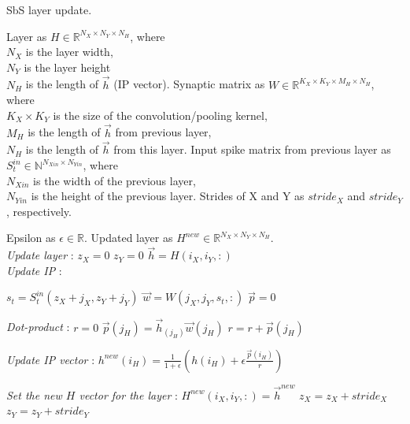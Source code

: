 \begin{algorithm}[t]
	\caption{SbS layer update.} \label{alg:update}
	
	\begin{algorithmic}[1]
		\SetAlgoLined
		\renewcommand{\algorithmicrequire}{\textbf{input:}}
		\renewcommand{\algorithmicensure}{\textbf{output:}}
		\REQUIRE Layer as $H\in\mathbb{R}^{N_X \times N_Y \times N_H}$, where\\
		$N_X$ is the layer width,\\
		$N_Y$ is the layer height\\
		$N_H$ is the length of $\vec{h}$ (IP vector).
		\REQUIRE Synaptic matrix as $W\in\mathbb{R}^{K_X \times K_Y \times M_H\times N_H}$, where\\
		$K_X \times K_Y$ is the size of the convolution/pooling kernel, \\
		$M_H$ is the length of $\vec{h}$ from previous layer,\\
		$N_H$ is the length of $\vec{h}$ from this layer.  
		\REQUIRE Input spike matrix from previous layer as $S_t^{in} \in\mathbb{N}^{N_{Xin} \times N_{Yin}}$, where\\
		$N_{Xin}$ is the width of the previous layer,\\
		$N_{Yin}$ is the height of the previous layer.
		\REQUIRE Strides of X and Y as $stride_{X}$ and $stride_{Y}$, respectively.
		
		\REQUIRE Epsilon as $\epsilon\in\mathbb{R}$.
		\ENSURE Updated layer as $H^{new}\in\mathbb{R}^{N_X \times N_Y \times N_H}$.
		\\
		\textit{Update layer} :
		\STATE $z_{X} = 0$ 
		\STATE $z_{Y} = 0$
		\STATE $\vec{h} = H(i_X, i_Y,:)$\\
		
		\textit{Update IP} :
		
		\STATE $s_t = S_t^{in}(z_{X}+j_X,z_{Y}+j_Y)$
		\STATE $\vec{w} = W(j_X,j_Y,s_t,:)$
		\STATE $\vec{p} = 0$
		
		\textit{Dot-product} :
		\STATE $r = 0$
		\STATE $\vec{p}(j_H) = \vec{h}_(j_H)\vec{w}(j_H)$
		\STATE $r = r + \vec{p}(j_H)$
		\ENDFOR
		
		
		\STATE \textit{Update IP vector} :
		\STATE
		$  h^{new}(i_H) = \frac{1}{1+\epsilon} \left(h(i_H) + \epsilon \frac{\vec{p}(i_H) }{r} \right) $
		\ENDFOR
		
		\textit{Set the new $H$ vector for the layer} :
		\STATE $H^{new}(i_X,i_Y,:) = \vec{h}^{new}$
		\ENDIF
		\ENDFOR
		\STATE $z_{X} = z_{X} + stride_{X}$
		\ENDFOR
		\STATE $z_{Y} = z_{Y} + stride_{Y}$
		\ENDFOR
		
	\end{algorithmic} 
\end{algorithm}